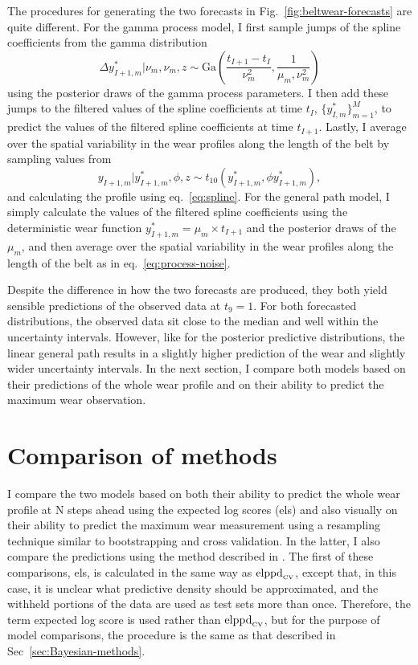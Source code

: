 The procedures for generating the two forecasts in Fig.~\ref{fig:beltwear-forecasts} are quite different. For the gamma process model, I first sample jumps of the spline coefficients from the gamma distribution
\begin{equation}
  \Delta y^*_{I + 1, m}|\nu_m, \nu_m, z \sim \text{Ga}\left(\frac{t_{I + 1} - t_{I}}{\nu_m^2}, \frac{1}{\mu_m, \nu_m^2}\right)
\end{equation}
using the posterior draws of the gamma process parameters. I then add these jumps to the filtered values of the spline coefficients at time $t_I$, $\{y^*_{I, m}\}^M_{m = 1}$, to predict the values of the filtered spline coefficients at time $t_{I + 1}$. Lastly, I average over the spatial variability in the wear profiles along the length of the belt by sampling values from
\begin{equation}
  \label{eq:process-noise}
  y_{I + 1, m}|y^*_{I + 1, m}, \phi, z \sim t_{10}(y^*_{I + 1, m}, \phi y^*_{I + 1, m}),
\end{equation}
and calculating the profile using eq.~\eqref{eq:spline}. For the general path model, I simply calculate the values of the filtered spline coefficients using the deterministic wear function $y^*_{I + 1, m} = \mu_m \times t_{I+1}$ and the posterior draws of the $\mu_m$, and then average over the spatial variability in the wear profiles along the length of the belt as in eq.~\eqref{eq:process-noise}.

Despite the difference in how the two forecasts are produced, they both yield sensible predictions of the observed data at $t_9 = 1$. For both forecasted distributions, the observed data sit close to the median and well within the uncertainty intervals. However, like for the posterior predictive distributions, the linear general path results in a slightly higher prediction of the wear and slightly wider uncertainty intervals. In the next section, I compare both models based on their predictions of the whole wear profile and on their ability to predict the maximum wear observation.

\section{Comparison of methods} \label{sec:belt-wear-comparison}

I compare the two models based on both their ability to predict the whole wear profile at N steps ahead using the expected log scores (els) and also visually on their ability to predict the maximum wear measurement using a resampling technique similar to bootstrapping and cross validation. In the latter, I also compare the predictions using the method described in \citet{webb_2020}. The first of these comparisons, els, is calculated in the same way as $\hbox{elppd}_{\text{\tiny{CV}}}$, except that, in this case, it is unclear what predictive density should be approximated, and the withheld portions of the data are used as test sets more than once. Therefore, the term expected log score is used rather than $\hbox{elppd}_{\text{\tiny{CV}}}$, but for the purpose of model comparisons, the procedure is the same as that described in Sec~\ref{sec:Bayesian-methods}.

